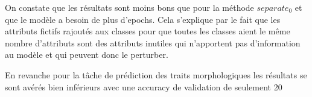\documentclass[a4paper]{article}
\begin{document}
On constate que les résultats sont moins bons que pour la méthode $separate_0$ et que le modèle a besoin de 
plus d'epochs. Cela s'explique par le fait que les attributs fictifs rajoutés aux classes 
pour que toutes les classes aient le même nombre d'attributs sont des attributs inutiles qui n'apportent pas 
d'information au modèle et qui peuvent donc le perturber.















En revanche pour la tâche de prédiction des traits morphologiques les résultats se sont avérés bien inférieurs avec une accuracy de validation de seulement 20%
\end{document}
